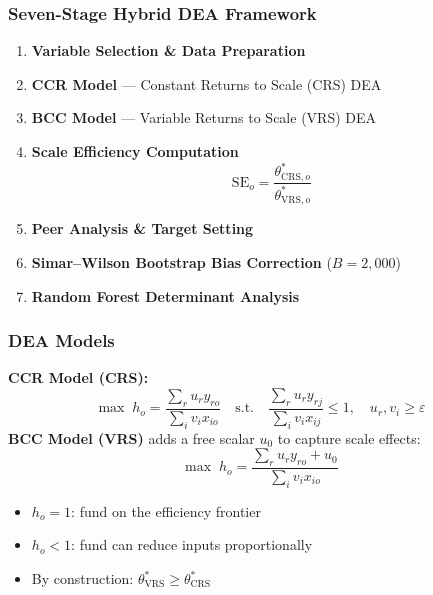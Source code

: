 \documentclass{beamer}
\begin{document}
\begin{frame}
    \frametitle{Seven-Stage Hybrid DEA Framework}
    \begin{enumerate}
        \item \textbf{Variable Selection \& Data Preparation}
        \item \textbf{CCR Model} --- Constant Returns to Scale (CRS) DEA
        \item \textbf{BCC Model} --- Variable Returns to Scale (VRS) DEA
        \item \textbf{Scale Efficiency Computation}
        \[
            \text{SE}_o = \frac{\theta^*_{\text{CRS},o}}{\theta^*_{\text{VRS},o}}
        \]
        \item \textbf{Peer Analysis \& Target Setting}
        \item \textbf{Simar--Wilson Bootstrap Bias Correction} ($B = 2{,}000$)
        \item \textbf{Random Forest Determinant Analysis}
    \end{enumerate}
\end{frame}

\begin{frame}
    \frametitle{DEA Models}
    \textbf{CCR Model (CRS):}
    \[
        \max \; h_o = \frac{\sum_{r} u_r y_{ro}}{\sum_{i} v_i x_{io}}
        \quad \text{s.t.} \quad
        \frac{\sum_{r} u_r y_{rj}}{\sum_{i} v_i x_{ij}} \leq 1, \quad u_r, v_i \geq \varepsilon
    \]
    \vspace{0.3em}
    \textbf{BCC Model (VRS)} adds a free scalar $u_0$ to capture scale effects:
    \[
        \max \; h_o = \frac{\sum_{r} u_r y_{ro} + u_0}{\sum_{i} v_i x_{io}}
    \]
    \begin{itemize}
        \item $h_o = 1$: fund on the efficiency frontier
        \item $h_o < 1$: fund can reduce inputs proportionally
        \item By construction: $\theta^*_{\text{VRS}} \geq \theta^*_{\text{CRS}}$
    \end{itemize}
\end{frame}
\end{document}
